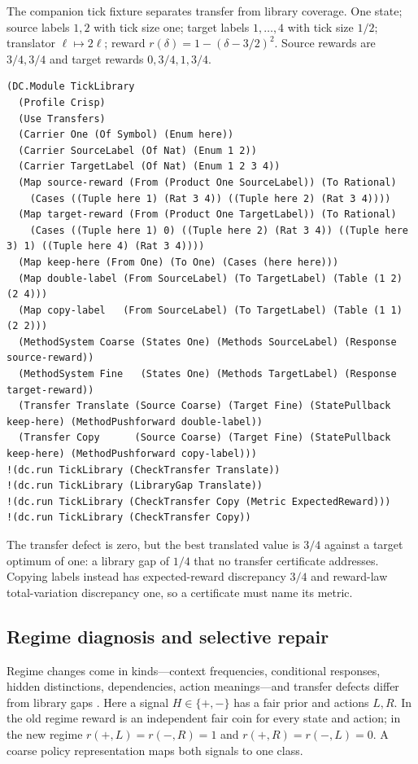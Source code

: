 \documentclass[11pt]{article}
\theoremstyle{definition}
\theoremstyle{plain}
\begin{document}
The companion tick fixture separates transfer from library coverage. One state; source labels
$1,2$ with tick size one; target labels $1,\dots,4$ with tick size $1/2$; translator $\ell\mapsto
2\ell$; reward $r(\delta)=1-(\delta-3/2)^2$. Source rewards are $3/4,3/4$ and target rewards
$0,3/4,1,3/4$.
\begin{lstlisting}[basicstyle=\ttfamily\footnotesize,title={\scriptsize\ttfamily fixtures/skill\_hive.metta}]
(DC.Module TickLibrary
  (Profile Crisp)
  (Use Transfers)
  (Carrier One (Of Symbol) (Enum here))
  (Carrier SourceLabel (Of Nat) (Enum 1 2))
  (Carrier TargetLabel (Of Nat) (Enum 1 2 3 4))
  (Map source-reward (From (Product One SourceLabel)) (To Rational)
    (Cases ((Tuple here 1) (Rat 3 4)) ((Tuple here 2) (Rat 3 4))))
  (Map target-reward (From (Product One TargetLabel)) (To Rational)
    (Cases ((Tuple here 1) 0) ((Tuple here 2) (Rat 3 4)) ((Tuple here 3) 1) ((Tuple here 4) (Rat 3 4))))
  (Map keep-here (From One) (To One) (Cases (here here)))
  (Map double-label (From SourceLabel) (To TargetLabel) (Table (1 2) (2 4)))
  (Map copy-label   (From SourceLabel) (To TargetLabel) (Table (1 1) (2 2)))
  (MethodSystem Coarse (States One) (Methods SourceLabel) (Response source-reward))
  (MethodSystem Fine   (States One) (Methods TargetLabel) (Response target-reward))
  (Transfer Translate (Source Coarse) (Target Fine) (StatePullback keep-here) (MethodPushforward double-label))
  (Transfer Copy      (Source Coarse) (Target Fine) (StatePullback keep-here) (MethodPushforward copy-label)))
!(dc.run TickLibrary (CheckTransfer Translate))
!(dc.run TickLibrary (LibraryGap Translate))
!(dc.run TickLibrary (CheckTransfer Copy (Metric ExpectedReward)))
!(dc.run TickLibrary (CheckTransfer Copy))
\end{lstlisting}
The transfer defect is zero, but the best translated value is $3/4$ against a target optimum of
one: a library gap of $1/4$ that no transfer certificate addresses. Copying labels instead has
expected-reward discrepancy $3/4$ and reward-law total-variation discrepancy one, so a certificate
must name its metric.

\subsection{Regime diagnosis and selective repair}\label{sec:regime}

Regime changes come in kinds---context frequencies, conditional responses, hidden distinctions,
dependencies, action meanings---and transfer defects differ from library gaps
\cite{regimes,marketmaking}. Here a signal $H\in\{+,-\}$ has a fair prior and actions $L,R$. In the
old regime reward is an independent fair coin for every state and action; in the new regime
$r(+,L)=r(-,R)=1$ and $r(+,R)=r(-,L)=0$. A coarse policy representation maps both signals to one
class.
\end{document}
